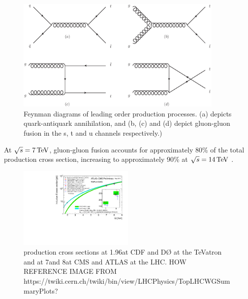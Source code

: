 \begin{figure}[hbtp]
   \centering
     \includegraphics[width=0.9\textwidth]{Chapters/03_Theory/Images/ttbar_production}\hfill
     \caption[Feynman diagrams of leading order \ttbar production processes.]{Feynman diagrams of leading
     order \ttbar production processes. (a) depicts quark-antiquark annihilation, and (b, (c) and (d) depict
     gluon-gluon fusion in the s, t and u channels respectively.)}
     \label{fig:ttbar_production}
\end{figure}

At $\sqrt{s}=7\,\text{Te\hspace{-.08em}V}$, gluon-gluon fusion accounts for approximately 80\% of the total \tquark production cross
section, increasing to approximately 90\% at $\sqrt{s}=14\,\text{Te\hspace{-.08em}V}$ \cite{Agashe:2014kda}.

\begin{figure}[hbtp]
   \centering
     \includegraphics[width=0.5\textwidth]{Chapters/03_Theory/Images/toplhcwg_ttxsec_sqrts_may2015}\hfill
     \caption[\ttbar production cross sections at 1.96\TeV at CDF and D{\O} at the TeVatron and at 7\TeV and
     8\TeV at CMS and ATLAS at the LHC.]{\ttbar production cross sections at 1.96\TeV at CDF and D{\O} at the
     TeVatron and at 7\TeV and 8\TeV at CMS and ATLAS at the LHC. HOW REFERENCE IMAGE FROM
     https://twiki.cern.ch/twiki/bin/view/LHCPhysics/TopLHCWGSummaryPlots?}
     \label{fig:ttbar_cross_sections}
\end{figure}


